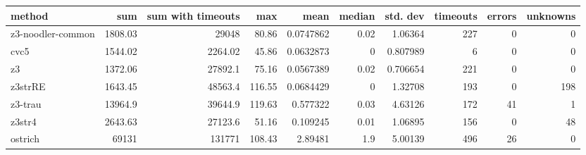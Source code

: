 \begin{tabular}{lrrrrrrrrr}
\hline
 method            &      sum &   sum with timeouts &    max &      mean &   median &   std. dev &   timeouts &   errors &   unknowns \\
\hline
 z3-noodler-common &  1808.03 &            29048    &  80.86 & 0.0747862 &     0.02 &   1.06364  &        227 &        0 &          0 \\
 cvc5              &  1544.02 &             2264.02 &  45.86 & 0.0632873 &     0    &   0.807989 &          6 &        0 &          0 \\
 z3                &  1372.06 &            27892.1  &  75.16 & 0.0567389 &     0.02 &   0.706654 &        221 &        0 &          0 \\
 z3strRE           &  1643.45 &            48563.4  & 116.55 & 0.0684429 &     0    &   1.32708  &        193 &        0 &        198 \\
 z3-trau           & 13964.9  &            39644.9  & 119.63 & 0.577322  &     0.03 &   4.63126  &        172 &       41 &          1 \\
 z3str4            &  2643.63 &            27123.6  &  51.16 & 0.109245  &     0.01 &   1.06895  &        156 &        0 &         48 \\
 ostrich           & 69131    &           131771    & 108.43 & 2.89481   &     1.9  &   5.00139  &        496 &       26 &          0 \\
\hline
\end{tabular}
